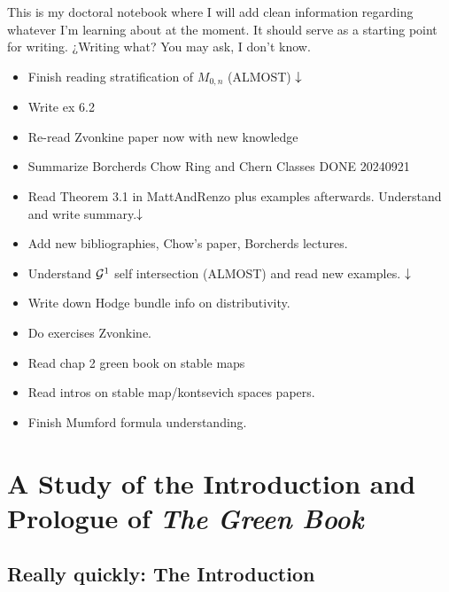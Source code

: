 \documentclass[12pt]{memoir}
\author{\nauthor}
\begin{document}
{\small 
\setlength{\parindent}{0em}
\setlength{\parskip}{1em}

This is my doctoral notebook where I will add clean information regarding whatever I'm learning about at the moment. It should serve as a starting point for writing. ¿Writing what? You may ask, I don't know.

\begin{itemize}
    \item Finish reading stratification of $M_{0,n}$ (ALMOST) $\downarrow$
    \item Write ex 6.2
    \item Re-read Zvonkine paper now with new knowledge
    \item Summarize Borcherds Chow Ring and Chern Classes DONE 20240921
\end{itemize}
\begin{itemize}
    \item Read Theorem 3.1 in MattAndRenzo plus examples afterwards. Understand and write summary.$\downarrow$
    \item Add new bibliographies, Chow's paper, Borcherds lectures.
\end{itemize}
\begin{itemize}
    \item Understand $\mathcal{G}^1$ self intersection (ALMOST) and read new examples. $\downarrow$
    \item Write down Hodge bundle info on distributivity.
    \item Do exercises Zvonkine.
\end{itemize}
\begin{itemize}
    \item Read chap 2 green book on stable maps
    \item Read intros on stable map/kontsevich spaces papers.
    \item Finish Mumford formula understanding.
\end{itemize}
}
\newpage
\tableofcontents
\chapter{A Study of the Introduction and Prologue of \emph{The Green Book}}

\section{Really quickly: The Introduction}
\end{document}
